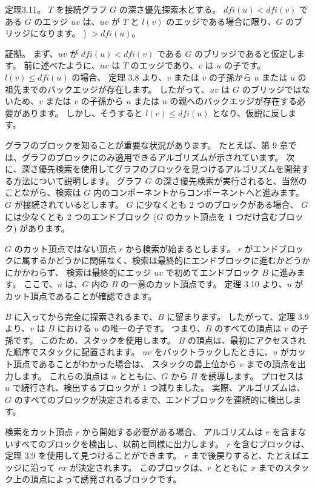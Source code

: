 
定理3.11。
$T$ を接続グラフ $G$ の深さ優先探索木とする。
$dfi(u) < dfi(v)$ である $G$ のエッジ $uv$ は、$uv$ が $T$ と $l(v)$ のエッジである場合に限り、$G$ のブリッジになります。 ) $> dfi(u)$。

証拠。
まず、$uv$ が $dfi(u) < dfi(v)$ である $G$ のブリッジであると仮定します。 
前に述べたように、$uv$ は $T$ のエッジであり、$v$ は $u$ の子です。 $l(v) \leq dfi(u)$ の場合、
定理 3.8 より、$v$ または $v$ の子孫から $u$ または $u$ の祖先までのバックエッジが存在します。
したがって、$uv$ は $G$ のブリッジではないため、$v$ または $v$ の子孫から $u$ または $u$ の親へのバックエッジが存在する必要があります。
しかし、そうすると $l(v) \leq dfi(u)$ となり、仮説に反します。

グラフのブロックを知ることが重要な状況があります。
たとえば、第 9 章では、グラフのブロックにのみ適用できるアルゴリズムが示されています。
次に、深さ優先検索を使用してグラフのブロックを見つけるアルゴリズムを開発する方法について説明します。
グラフ $G$ の深さ優先検索が実行されると、当然のことながら、検索は $G$ 内のコンポーネントからコンポーネントへと進みます。
$G$ が接続されているとします。 $G$ に少なくとも 2 つのブロックがある場合、
$G$ には少なくとも 2 つのエンドブロック ($G$ のカット頂点を 1 つだけ含むブロック) があります。

$G$ のカット頂点ではない頂点 $r$ から検索が始まるとします。
$r$ がエンドブロックに属するかどうかに関係なく、検索は最終的にエンドブロックに進むかどうかにかかわらず、
検索は最終的にエッジ $uv$ で初めてエンドブロック $B$ に進みます。 ここで、$u$ は、$G$ 内の $B$ の一意のカット頂点です。
定理 3.10 より、$u$ がカット頂点であることが確認できます。

$B$ に入ってから完全に探索されるまで、$B$ に留まります。
したがって、定理 3.9 より、$v$ は $B$ における $u$ の唯一の子です。
つまり、$B$ のすべての頂点は $v$ の子孫です。 このため、スタックを使用します。
$B$ の頂点は、最初にアクセスされた順序でスタックに配置されます。
$uv$ をバックトラックしたときに、$u$ がカット頂点であることがわかった場合は、
スタックの最上位から $v$ までの頂点を出力します。 これらの頂点は $u$ とともに、$G$ から $B$ を誘導します。
プロセスは $u$ で続行され、検出するブロックが 1 つ減りました。
実際、アルゴリズムは、$G$ のすべてのブロックが決定されるまで、エンドブロックを連続的に検出します。

検索をカット頂点 $r$ から開始する必要がある場合、
アルゴリズムは $r$ を含まないすべてのブロックを検出し、以前と同様に出力します。
$r$ を含むブロックは、定理 3.9 を使用して見つけることができます。
$r$ まで後戻りすると、たとえばエッジに沿って $rx$ が決定されます。
このブロックは、$r$ とともに $x$ までのスタック上の頂点によって誘発されるブロックです。